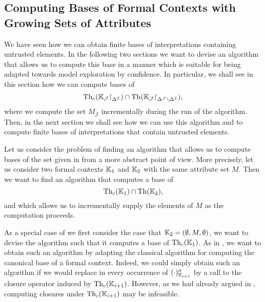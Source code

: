 \subsection{Computing Bases of Formal Contexts with Growing Sets of Attributes}
\label{sec:grow-sets-attr-1}

We have seen how we can obtain finite bases of interpretations containing untrusted
elements.  In the following two sections we want to devise an algorithm that allows us to
compute this base in a manner which is suitable for being adapted towards model
exploration by confidence.  In particular, we shall see in this section how we can compute
bases of
\begin{equation}
  \label{eq:52}
  \operatorname{Th}_{c}({\mathbb{K}}_{\mathcal{J}} \mathord{\upharpoonright}_{\Delta^{\mathcal{I}}}) \cap \operatorname{Th}({\mathbb{K}}_{\mathcal{J}} \mathord{\upharpoonright}_{\Delta^{\mathcal{J}} \setminus \Delta^{\mathcal{I}}}),
\end{equation}
where we compute the set $M_{\mathcal{J}}$ incrementally during the run of the algorithm.
Then, in the next section we shall see how we can use this algorithm and
 to compute finite
bases of interpretations that contain untrusted elements.

Let us consider the problem of finding an algorithm that allows us to compute bases of the
set given in  from a more abstract point of view.  More precisely, let us
consider two formal contexts ${\mathbb{K}}_{1}$ and ${\mathbb{K}}_{2}$ with the same attribute set
$M$.  Then we want to find an algorithm that computes a base of
\begin{equation}
  \label{eq:53}
  \operatorname{Th}_{c}({\mathbb{K}}_{1}) \cap \operatorname{Th}({\mathbb{K}}_{2}),
\end{equation}
and which allows us to incrementally supply the elements of $M$ as the computation
proceeds.

As a special case of  we first consider the case that ${\mathbb{K}}_{2} =
(\emptyset, M, \emptyset)$, \ie we want to devise the algorithm such that it computes a
base of $\operatorname{Th}_{c}({\mathbb{K}}_{1})$.  As in , we want to obtain such an
algorithm by adapting the classical algorithm for computing the canonical base of a formal
context.  Indeed, we could simply obtain such an algorithm if we would replace in
 every occurrence of $(\cdot)_{{\mathbb{K}}_{i+1}}''$
by a call to the closure operator induced by $\operatorname{Th}_{c}({\mathbb{K}}_{i+1})$.  However, as we had
already argued in , computing closures under $\operatorname{Th}_{c}({\mathbb{K}}_{i+1})$
may be infeasible.

